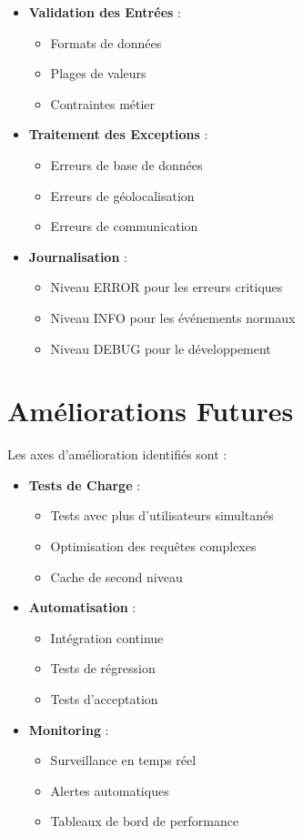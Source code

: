\begin{itemize}
    \item \textbf{Validation des Entrées} :
    \begin{itemize}
        \item Formats de données
        \item Plages de valeurs
        \item Contraintes métier
    \end{itemize}
    
    \item \textbf{Traitement des Exceptions} :
    \begin{itemize}
        \item Erreurs de base de données
        \item Erreurs de géolocalisation
        \item Erreurs de communication
    \end{itemize}
    
    \item \textbf{Journalisation} :
    \begin{itemize}
        \item Niveau ERROR pour les erreurs critiques
        \item Niveau INFO pour les événements normaux
        \item Niveau DEBUG pour le développement
    \end{itemize}
\end{itemize}

\section{Améliorations Futures}
Les axes d'amélioration identifiés sont :

\begin{itemize}
    \item \textbf{Tests de Charge} :
    \begin{itemize}
        \item Tests avec plus d'utilisateurs simultanés
        \item Optimisation des requêtes complexes
        \item Cache de second niveau
    \end{itemize}
    
    \item \textbf{Automatisation} :
    \begin{itemize}
        \item Intégration continue
        \item Tests de régression
        \item Tests d'acceptation
    \end{itemize}
    
    \item \textbf{Monitoring} :
    \begin{itemize}
        \item Surveillance en temps réel
        \item Alertes automatiques
        \item Tableaux de bord de performance
    \end{itemize}
\end{itemize}